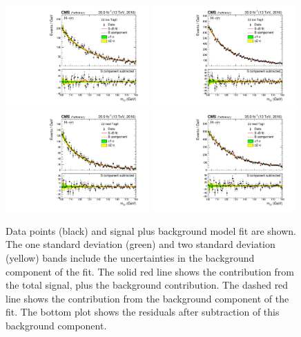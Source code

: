 \begin{figure}[hptb]
  \centering
  \includegraphics[width=0.49\textwidth]{Figures/Appendices/_forAppendix2016ch1_RECO_GE2J_PTH_0_60_Tag0_13TeV.pdf}
  \includegraphics[width=0.49\textwidth]{Figures/Appendices/_forAppendix2016ch1_RECO_GE2J_PTH_0_60_Tag1_13TeV.pdf}
  \includegraphics[width=0.49\textwidth]{Figures/Appendices/_forAppendix2016ch1_RECO_GE2J_PTH_60_120_Tag0_13TeV.pdf}
  \includegraphics[width=0.49\textwidth]{Figures/Appendices/_forAppendix2016ch1_RECO_GE2J_PTH_60_120_Tag1_13TeV.pdf}
  \caption[Signal plus background fits to data.]
  {
    Data points (black) and signal plus background model fit are shown. 
    The one standard deviation (green) and two standard deviation (yellow) bands 
    include the uncertainties in the background component of the fit. 
    The solid red line shows the contribution from the total signal, plus the background contribution. 
    The dashed red line shows the contribution from the background component of the fit. 
    The bottom plot shows the residuals after subtraction of this background component.
  }
\end{figure}

